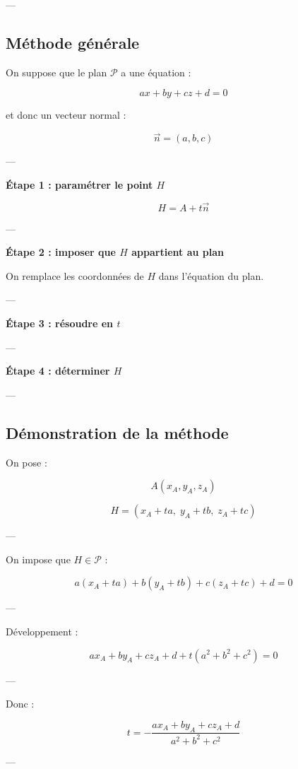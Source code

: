 \documentclass[11pt,a4paper]{article}
\begin{document}
---

\subsection{Méthode générale}

On suppose que le plan $\mathcal{P}$ a une équation :

\[
ax + by + cz + d = 0
\]

et donc un vecteur normal :

\[
\vec{n} = (a,b,c)
\]

---

\textbf{Étape 1 : paramétrer le point $H$}

\[
H = A + t\vec{n}
\]

---

\textbf{Étape 2 : imposer que $H$ appartient au plan}

On remplace les coordonnées de $H$ dans l’équation du plan.

---

\textbf{Étape 3 : résoudre en $t$}

---

\textbf{Étape 4 : déterminer $H$}

---

\subsection{Démonstration de la méthode}

On pose :

\[
A(x_A,y_A,z_A)
\]

\[
H = (x_A + ta,\; y_A + tb,\; z_A + tc)
\]

---

On impose que $H \in \mathcal{P}$ :

\[
a(x_A + ta) + b(y_A + tb) + c(z_A + tc) + d = 0
\]

---

Développement :

\[
ax_A + by_A + cz_A + d + t(a^2 + b^2 + c^2) = 0
\]

---

Donc :

\[
\boxed{
t = -\frac{ax_A + by_A + cz_A + d}{a^2 + b^2 + c^2}
}
\]

---
\end{document}
